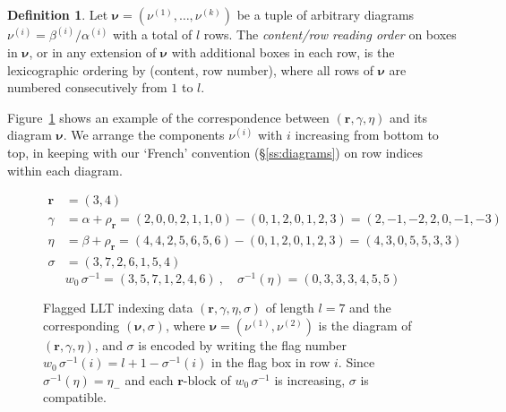 \documentclass[12pt]{amsart}
\theoremstyle{definition}
\newtheorem{defn}[thm]{Definition}
\theoremstyle{remark}
\newcommand{\rr}{{\mathbf r}}
\newcommand{\nubold}{{\boldsymbol \nu }}
\newcommand{\flagwave}[1]{\vphantom{1}^{\#}\!\mathsf{#1}}
\begin{document}
\begin{defn}\label{def:reading-order}
Let $\nubold = (\nu ^{(1)},\ldots,\nu ^{(k)})$ be a tuple of arbitrary
diagrams $\nu ^{(i)} = \beta ^{(i)}/\alpha ^{(i)}$ with a total of $l$
rows.  The {\em content/row reading order} on boxes in $\nubold $, or
in any extension of $\nubold $ with additional boxes in each row, is
the lexicographic ordering by (content, row number), where all rows of
$\nubold $ are numbered consecutively from $1$ to $l$.
\end{defn}



Figure~\ref{fig:flagged-LLT} shows an example of the correspondence
between $(\rr , \gamma ,\eta )$ and its diagram $\nubold $.  We
arrange the components $\nu ^{(i)}$ with $i$ increasing from bottom to
top, in keeping with our `French' convention (\S \ref{ss:diagrams}) on
row indices within each diagram.

\begin{figure}
\begin{align*}
\rr &  = (3,4) \\
\gamma & = \alpha + \rho _{\rr }  = (2,0,0,2,1,1,0) - (0,1,2,0,1,2,3) =
(2,-1,-2,2,0,-1,-3) \\
\eta & = \beta + \rho _{\rr } = (4,4,2,5,6,5,6) - (0,1,2,0,1,2,3)
 =(4,3,0,5,5,3,3) \\
\sigma & = (3,7,2,6,1,5,4)
\end{align*}
\[
w_0\,\sigma^{-1} = (3, 5, 7, 1, 2, 4, 6)\ ,\quad \sigma ^{-1}(\eta )
 = (0,3,3,3,4,5,5)
\]
\caption{\label{fig:flagged-LLT}Flagged LLT indexing data $(\rr
,\gamma ,\eta ,\sigma )$ of length $l=7$ and the corresponding
$(\nubold , \sigma )$, where $\nubold = (\nu ^{(1)}, \nu ^{(2)}) $ is
the diagram of $(\rr ,\gamma ,\eta )$, and $\sigma $ is encoded by
writing the flag number $w_0\, \sigma^{-1}(i) = l+1-\sigma ^{-1}(i)$
in the flag box in row $i$.  Since $ \sigma ^{-1}(\eta ) = \eta _{-}$
and each $\rr $-block of $w_0\,\sigma^{-1}$ is increasing, $\sigma $
is compatible.}
\end{figure}
\end{document}
